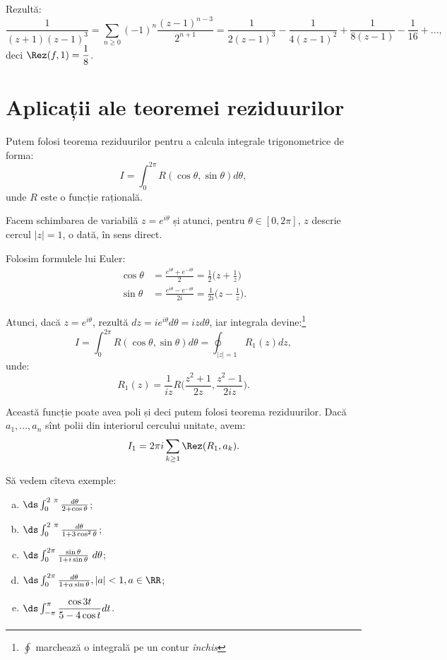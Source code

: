 Rezultă:
\[
  \frac{1}{(z + 1)(z - 1)^3} = \sum_{n \geq 0} (-1)^n \frac{(z - 1)^{n-3}}{2^{n+1}} = %
  \frac{1}{2(z - 1)^3} - \frac{1}{4(z - 1)^2} + \frac{1}{8(z - 1)} - \frac{1}{16} + \dots,
\]
deci $ \Rez(f, 1) = \dfrac{1}{8} $.


\section{Aplicații ale teoremei reziduurilor}

\indent\indent Putem folosi teorema reziduurilor pentru a calcula integrale trigonometrice de forma:
\[
  I = \int_0^{2 \pi} R(\cos \theta, \sin \theta) d \theta,
\]
unde $ R $ este o funcție rațională.

Facem schimbarea de variabilă $ z = e^{i\theta} $ și atunci, pentru $ \theta \in [0, 2\pi] $,
$ z $ descrie cercul $ |z| = 1 $, o dată, în sens direct.

Folosim formulele lui Euler:
\begin{align*}
  \cos \theta &= \frac{e^{i\theta} + e^{-i\theta}}{2} = \frac{1}{2} \Big( z + \frac{1}{z} \Big) \\
  \sin \theta &= \frac{e^{i\theta} - e^{-i\theta}}{2i} = \frac{1}{2i} \Big( z - \frac{1}{z} \Big).
\end{align*}

Atunci, dacă $ z = e^{i\theta} $, rezultă $ dz = ie^{i\theta} d\theta = izd\theta $,
iar integrala devine:\footnote{$\oint$ marchează o integrală pe un contur \emph{închis}}
\[
  I = \int_0^{2 \pi} R(\cos \theta, \sin \theta) d\theta = \oint_{|z| = 1} R_1(z) dz,
\]
unde:
\[
  R_1(z) = \frac{1}{iz} R\Big( \frac{z^2 + 1}{2z}, \frac{z^2 - 1}{2iz} \Big).
\]

Această funcție poate avea poli și deci putem folosi teorema reziduurilor. Dacă
$ a_1, \dots, a_n $ sînt polii din interiorul cercului unitate, avem:
\[
  I_1 = 2 \pi i \sum_{k \geq 1} \Rez(R_1, a_k).
\]

\vspace{1cm}

Să vedem cîteva exemple:
\begin{enumerate}[(a)]
\item $ \ds\int_0^{2 \pi} \frac{d\theta}{2 + \cos \theta} $;
\item $ \ds\int_0^{2 \pi} \frac{d\theta}{1 + 3 \cos^2 \theta} $;
\item $ \ds\int_0^{2 \pi} \frac{\sin \theta}{1 + i \sin \theta} d\theta $;
\item $ \ds\int_0^{2 \pi} \frac{d\theta}{1 + a \sin \theta}, |a| < 1, a \in \RR $;
\item $ \ds\int_{-\pi}^\pi \dfrac{\cos 3t}{5 - 4\cos t} dt $.
\end{enumerate}

